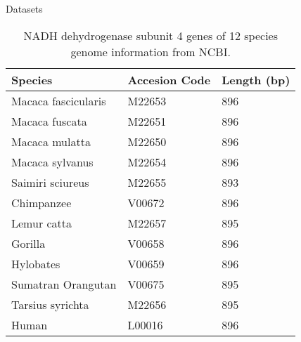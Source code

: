 \documentclass[10pt]{beamer}
\newcommand{\1}{
	\setbeamertemplate{background}{
		\texttt{[image: img/1\_dna]}
		\tikz[overlay] \fill[fill opacity=0.75,fill=white] (0,0) rectangle (-\paperwidth,\paperheight);
	}
}
\begin{document}
\begin{frame}{Datasets}
\begin{table}[]
	\centering
	\caption{NADH dehydrogenase subunit 4 genes of 12 species genome information from NCBI.}
	\label{tab:nadhdb}
	\begin{tabular}{lll}
		\hline
		Species             & Accesion Code & Length (bp) \\ \hline
		Macaca fascicularis & M22653        & 896         \\
		Macaca fuscata      & M22651        & 896         \\
		Macaca mulatta      & M22650        & 896         \\
		Macaca sylvanus     & M22654        & 896         \\
		Saimiri sciureus    & M22655        & 893         \\
		Chimpanzee          & V00672        & 896         \\
		Lemur catta         & M22657        & 895         \\
		Gorilla             & V00658        & 896         \\
		Hylobates           & V00659        & 896         \\
		Sumatran Orangutan  & V00675        & 895         \\
		Tarsius syrichta    & M22656        & 895         \\
		Human               & L00016        & 896        \\ \hline
	\end{tabular}
\end{table}
\end{frame}
\end{document}
